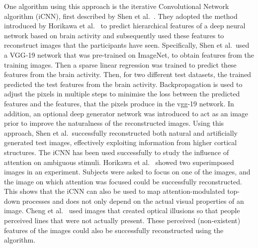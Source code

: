 One algorithm using this approach is the iterative Convolutional Network algorithm (iCNN), first described by Shen et al.~\cite{shenDeepImageReconstruction2019}. They adopted the method introduced by Horikawa et al.~\cite{horikawaGenericDecodingSeen2017} to predict hierarchical features of a deep neural network based on brain activity and subsequently used these features to reconstruct images that the participants have seen. Specifically, Shen et al.\ used a VGG-19 network that was pre-trained on ImageNet, to obtain features from the training images. Then a sparse linear regression was trained to predict these features from the brain activity. Then, for two different test datasets, the trained  predicted the test features from the brain activity. Backpropagation is used to adjust the pixels in multiple steps to minimise the loss between the predicted features and the features, that the pixels produce in the vgg-19 network. In addition, an optional deep generator network was introduced to act as an image prior to improve the naturalness of the reconstructed images. Using this approach, Shen et al.\ successfully reconstructed both natural and artificially generated test images, effectively exploiting information from higher cortical structures. The iCNN has been used successfully to study the influence of attention on ambiguous stimuli. Horikawa et al.~\cite{horikawaAttentionModulatesNeural2022} showed two superimposed images in an experiment. Subjects were asked to focus on one of the images, and the image on which attention was focused could be successfully reconstructed. This shows that the iCNN can also be used to map attention-modulated top-down processes and does not only depend on the actual visual properties of an image. Cheng et al.~\cite{chengReconstructingVisualIllusory2023} used images that created optical illusions so that people perceived lines that were not actually present. These perceived (non-existent) features of the images could also be successfully reconstructed using the algorithm.





